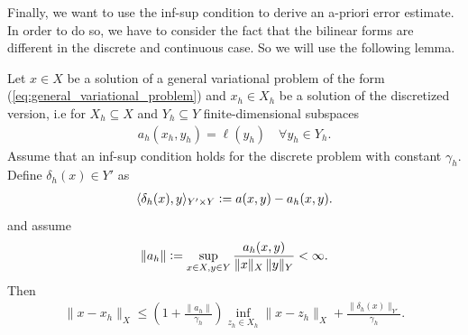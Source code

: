 \documentclass[../master_thesis.tex]{subfiles}
\begin{document}
Finally, we want to use the inf-sup condition to derive an a-priori error estimate. 
In order to do so, we have to consider the fact that the bilinear forms 
are different in the discrete and continuous case. So we will use the following lemma.
\begin{lemma}\label{lem:a_priori_estimate_from_infsup}
    Let $x \in X$ be a solution of a general variational problem of the form (\ref{eq:general_variational_problem}) 
    and $x_h \in X_h$ be a solution of the discretized version, i.e for $X_h \subseteq X$ 
    and $ Y_h \subseteq Y$ finite-dimensional subspaces
    \begin{align*}
        a_h(x_h,y_h) = \ell(y_h) \quad \forall y_h \in Y_h.
    \end{align*}
    Assume that an inf-sup condition holds for the discrete problem with constant 
    $\gamma_h$.
    Define $\delta_h(x) \in Y'$ as 
    \begin{align*}
        \langle \delta_h(x), y \rangle_{Y'\times Y} 
        \vcentcolon= a(x,y) - a_h(x,y).
    \end{align*}
    and assume 
    \begin{align*}
        \lVert a_h \rVert \vcentcolon= \sup_{x\in X, y\in Y}\frac{a_h(x,y)}{\lVert x \rVert _X \, \lVert y \rVert _Y}  
        < \infty.    
    \end{align*}
    Then
    \begin{align*}
        \lVert x - x_h \rVert _X 
        \leq \left( 1 + \frac{\lVert a_h \rVert}{\gamma_h} \right) 
            \inf_{z_h \in X_h} \lVert x - z_h\rVert _X + \frac{\lVert \delta_h(x) \rVert _{Y'}}{\gamma_h}.
    \end{align*}
\end{lemma}
\end{document}
